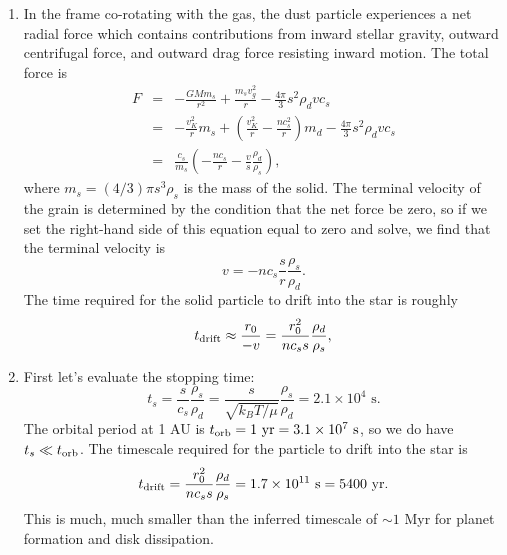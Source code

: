 \begin{enumerate}
\begin{enumerate}
\item In the frame co-rotating with the gas, the dust particle experiences a net radial force which contains contributions from inward stellar gravity, outward centrifugal force, and outward drag force resisting inward motion. The total force is
\begin{eqnarray*}
F & = & -\frac{GM m_s}{r^2} + \frac{m_s v_g^2}{r} - \frac{4\pi}{3} s^2 \rho_d v c_s \\
& = & -\frac{v_K^2}{r} m_s + \left(\frac{v_K^2}{r} - \frac{n c_s^2}{r}\right) m_d - \frac{4\pi}{3} s^2 \rho_d v c_s \\
& = & \frac{c_s}{m_s} \left(-\frac{nc_s}{r} - \frac{v}{s}\frac{\rho_d}{\rho_s}\right),
\end{eqnarray*}
where $m_s = (4/3)\pi s^3 \rho_s$ is the mass of the solid. The terminal velocity of the grain is determined by the condition that the net force be zero, so if we set the right-hand side of this equation equal to zero and solve, we find that the terminal velocity is
\begin{displaymath}
v = -n c_s\frac{s}{r} \frac{\rho_s}{\rho_d}.
\end{displaymath}
The time required for the solid particle to drift into the star is roughly
\begin{displaymath}
t_{\rm drift} \approx \frac{r_0}{-v} = \frac{r_0^2}{n c_s s}\frac{\rho_d}{\rho_s},
\end{displaymath}

\item First let's evaluate the stopping time:
\begin{displaymath}
t_s = \frac{s}{c_s} \frac{\rho_s}{\rho_d} = \frac{s}{\sqrt{k_B T/\mu}} \frac{\rho_s}{\rho_d} = 2.1\times 10^4\mbox{ s}.
\end{displaymath}
The orbital period at 1 AU is $t_{\rm orb} = 1\mbox{ yr} = 3.1\times 10^7\mbox{ s}$, so we do have $t_s \ll t_{\rm orb}$. The timescale required for the particle to drift into the star is
\begin{displaymath}
t_{\rm drift} =  \frac{r_0^2}{n c_s s}\frac{\rho_d}{\rho_s} = 1.7\times 10^{11}\mbox{ s} = 5400\mbox{ yr}.
\end{displaymath}
This is much, much smaller than the inferred timescale of $\sim 1$ Myr for planet formation and disk dissipation.

\end{enumerate}

\end{enumerate}



